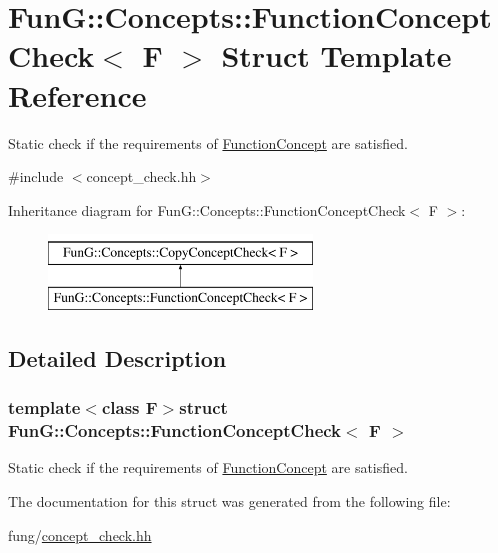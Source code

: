 \hypertarget{structFunG_1_1Concepts_1_1FunctionConceptCheck}{\section{Fun\-G\-:\-:Concepts\-:\-:Function\-Concept\-Check$<$ F $>$ Struct Template Reference}
\label{structFunG_1_1Concepts_1_1FunctionConceptCheck}
}


Static check if the requirements of \hyperlink{structFunG_1_1Concepts_1_1FunctionConcept}{Function\-Concept} are satisfied.  




{\ttfamily \#include $<$concept\-\_\-check.\-hh$>$}

Inheritance diagram for Fun\-G\-:\-:Concepts\-:\-:Function\-Concept\-Check$<$ F $>$\-:\begin{figure}[H]
\begin{center}
\leavevmode
\includegraphics[height=2.000000cm]{structFunG_1_1Concepts_1_1FunctionConceptCheck}
\end{center}
\end{figure}


\subsection{Detailed Description}
\subsubsection*{template$<$class F$>$struct Fun\-G\-::\-Concepts\-::\-Function\-Concept\-Check$<$ F $>$}

Static check if the requirements of \hyperlink{structFunG_1_1Concepts_1_1FunctionConcept}{Function\-Concept} are satisfied. 

The documentation for this struct was generated from the following file\-:\begin{DoxyCompactItemize}
\item 
fung/\hyperlink{concept__check_8hh}{concept\-\_\-check.\-hh}\end{DoxyCompactItemize}
